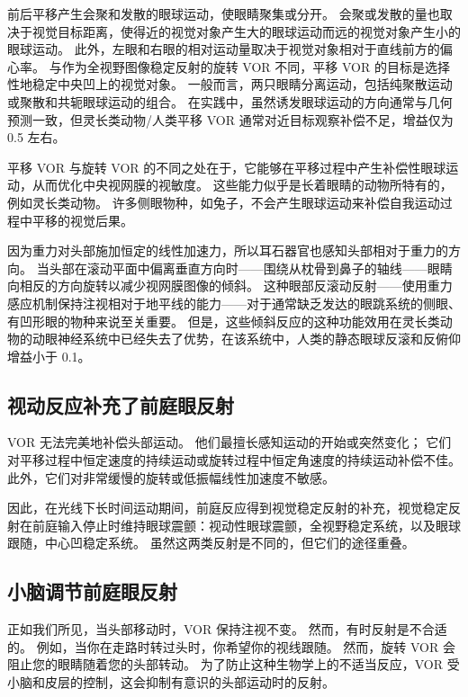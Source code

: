 前后平移产生会聚和发散的眼球运动，使眼睛聚集或分开。
会聚或发散的量也取决于视觉目标距离，使得近的视觉对象产生大的眼球运动而远的视觉对象产生小的眼球运动。
此外，左眼和右眼的相对运动量取决于视觉对象相对于直线前方的偏心率。
与作为全视野图像稳定反射的旋转 VOR 不同，平移 VOR 的目标是选择性地稳定中央凹上的视觉对象。
一般而言，两只眼睛分离运动，包括纯聚散运动或聚散和共轭眼球运动的组合。
在实践中，虽然诱发眼球运动的方向通常与几何预测一致，但灵长类动物/人类平移 VOR 通常对近目标观察补偿不足，增益仅为 0.5 左右。


平移 VOR 与旋转 VOR 的不同之处在于，它能够在平移过程中产生补偿性眼球运动，从而优化中央视网膜的视敏度。
这些能力似乎是长着眼睛的动物所特有的，例如灵长类动物。
许多侧眼物种，如兔子，不会产生眼球运动来补偿自我运动过程中平移的视觉后果。


因为重力对头部施加恒定的线性加速力，所以耳石器官也感知头部相对于重力的方向。
当头部在滚动平面中偏离垂直方向时——围绕从枕骨到鼻子的轴线——眼睛向相反的方向旋转以减少视网膜图像的倾斜。
这种眼部反滚动反射——使用重力感应机制保持注视相对于地平线的能力——对于通常缺乏发达的眼跳系统的侧眼、有凹形眼的物种来说至关重要。
但是，这些倾斜反应的这种功能效用在灵长类动物的动眼神经系统中已经失去了优势，在该系统中，人类的静态眼球反滚和反俯仰增益小于 0.1。



\subsection{视动反应补充了前庭眼反射}

VOR 无法完美地补偿头部运动。
他们最擅长感知运动的开始或突然变化；
它们对平移过程中恒定速度的持续运动或旋转过程中恒定角速度的持续运动补偿不佳。
此外，它们对非常缓慢的旋转或低振幅线性加速度不敏感。


因此，在光线下长时间运动期间，前庭反应得到视觉稳定反射的补充，视觉稳定反射在前庭输入停止时维持眼球震颤：视动性眼球震颤，全视野稳定系统，以及眼球跟随，中心凹稳定系统。
虽然这两类反射是不同的，但它们的途径重叠。



\subsection{小脑调节前庭眼反射}

正如我们所见，当头部移动时，VOR 保持注视不变。 然而，有时反射是不合适的。
例如，当你在走路时转过头时，你希望你的视线跟随。
然而，旋转 VOR 会阻止您的眼睛随着您的头部转动。
为了防止这种生物学上的不适当反应，VOR 受小脑和皮层的控制，这会抑制有意识的头部运动时的反射。



